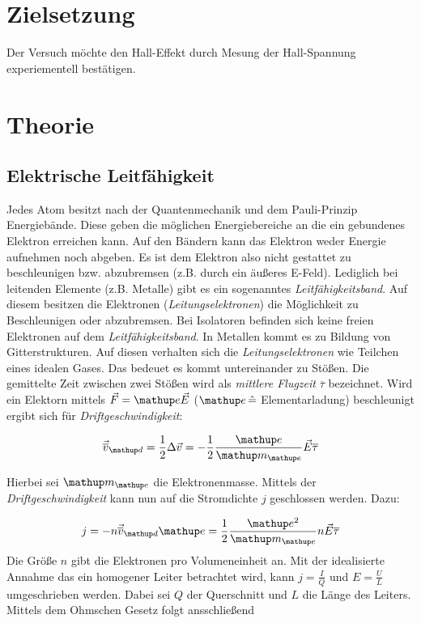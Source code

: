 \setcounter{page}{1}
\section*{Zielsetzung}
Der Versuch möchte den Hall-Effekt durch Mesung der 
Hall-Spannung experiementell bestätigen.

\section{Theorie}

\subsection{Elektrische Leitfähigkeit}
Jedes Atom besitzt nach der Quantenmechanik und dem Pauli-Prinzip 
Energiebände.
Diese geben die möglichen Energiebereiche an die ein gebundenes Elektron 
erreichen kann. Auf den Bändern kann das Elektron weder 
Energie aufnehmen noch abgeben. Es ist dem Elektron also 
nicht gestattet zu beschleunigen bzw. abzubremsen (z.B. durch ein äußeres E-Feld).
Lediglich bei leitenden Elemente (z.B. Metalle) gibt es ein sogenanntes \emph{Leitfähigkeitsband}.
Auf diesem besitzen die Elektronen (\emph{Leitungselektronen}) die Möglichkeit zu Beschleunigen oder abzubremsen.
Bei Isolatoren befinden sich keine freien Elektronen auf dem \emph{Leitfähigkeitsband}.
In Metallen kommt es zu Bildung von Gitterstrukturen. 
Auf diesen verhalten sich die \emph{Leitungselektronen} wie Teilchen eines idealen Gases.
Das bedeuet es kommt untereinander zu Stößen.
Die gemittelte Zeit zwischen zwei Stößen wird als \emph{mittlere Flugzeit} $\overline{\tau}$ bezeichnet.
Wird ein Elektorn mittels $\vec{F}=\map{e}\vec{E}$ ($\map{e}\, \hat{=}$ Elementarladung) beschleunigt 
ergibt sich für \emph{Driftgeschwindigkeit}:

\begin{equation}
\label{eq:drift_v}
\vec{\overline{v}}\ua{d}=\frac{1}{2}\Delta\vec{v}=-\frac{1}{2}\frac{\map{e}}{\map{m}\ua{e}}\vec{E}\overline{\tau}
\end{equation}

Hierbei sei $\map{m}\ua{e}$ die Elektronenmasse.
Mittels der \emph{Driftgeschwindigkeit} kann nun auf die Stromdichte $j$ geschlossen werden. Dazu:

\begin{equation}
\label{eq:stromdicht}
j=-n\vec{\overline{v}}\ua{d}\map{e}=\frac{1}{2}\frac{\map{e^2}}{\map{m}\ua{e}}n\vec{E}\overline{\tau}
\end{equation}
Die Größe $n$ gibt die Elektronen pro Volumeneinheit an.
Mit der idealisierte Annahme das ein homogener Leiter betrachtet wird, kann 
$j=\frac{I}{Q}$ und $E=\frac{U}{L}$ umgeschrieben werden.
Dabei sei $Q$ der Querschnitt und $L$ die Länge des Leiters.
Mittels dem Ohmschen Gesetz folgt ansschließend

